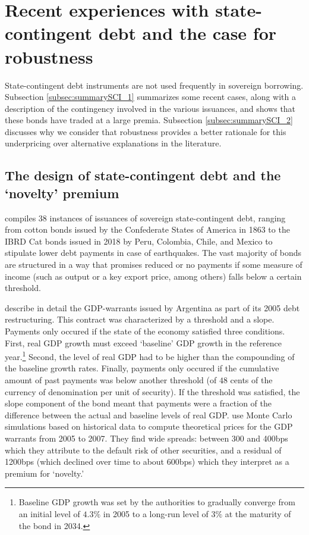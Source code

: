 \section{Recent experiences with state-contingent debt and the case for robustness \label{sec:summarySCI}}

State-contingent debt instruments are not used frequently in sovereign borrowing. Subsection \ref{subsec:summarySCI_1} summarizes some recent cases, along with a description of the contingency involved in the various issuances, and shows that these bonds have traded at a large premia. Subsection \ref{subsec:summarySCI_2} discusses why we consider that robustness provides a better rationale for this underpricing over alternative explanations in the literature.

\subsection{The design of state-contingent debt and the `novelty' premium \label{subsec:summarySCI_1}}

\citet*{databaseSCI} compiles 38 instances of issuances of sovereign state-contingent debt, ranging from cotton bonds issued by the Confederate States of America in 1863 to the IBRD Cat bonds issued in 2018 by Peru, Colombia, Chile, and Mexico to stipulate lower debt payments in case of earthquakes. The vast majority of bonds are structured in a way that promises reduced or no payments if some measure of income (such as output or a key export price, among others) falls below a certain threshold. 

\citet*{ChamonCostaRicci2008} describe in detail the GDP-warrants issued by Argentina as part of its 2005 debt restructuring. This contract was characterized by a threshold and a slope. Payments only occured if the state of the economy satisfied three conditions. First, real GDP growth must exceed `baseline' GDP growth in the reference year.\footnote{Baseline GDP growth was set by the authorities to gradually converge from an initial level of $4.3\%$ in 2005 to a long-run level of $3\%$ at the maturity of the bond in 2034.} Second, the level of real GDP had to be higher than the compounding of the baseline growth rates. Finally, payments only occured if the cumulative amount of past payments was below another threshold (of $48$ cents of the currency of denomination per unit of security). If the threshold was satisfied, the slope component of the bond meant that payments were a fraction of the difference between the actual and baseline levels of real GDP. \citet*{ChamonCostaRicci2008} use Monte Carlo simulations based on historical data to compute theoretical prices for the GDP warrants from 2005 to 2007. They find wide spreads: between 300 and 400bps which they attribute to the default risk of other securities, and a residual of 1200bps (which declined over time to about 600bps) which they interpret as a premium for `novelty.'

